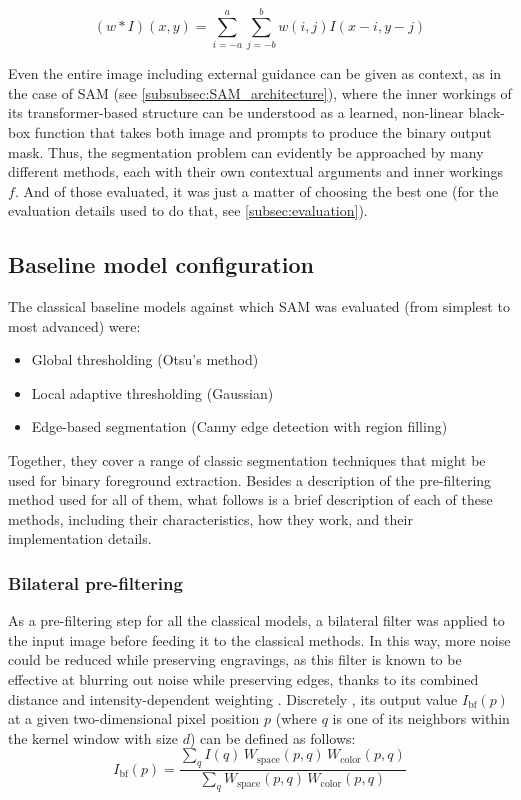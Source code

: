 $$ (w * I)(x,y) = \sum_{i=-a}^{a} \sum_{j=-b}^{b} w(i,j) I(x-i, y-j) $$

\noindent Even the entire image including external guidance can be given as context, as in the case of \acs{SAM} (see \cref{subsubsec:SAM_architecture}), where the inner workings of its transformer-based structure can be understood as a learned, non-linear black-box function that takes both image and prompts to produce the binary output mask.
Thus, the segmentation problem can evidently be approached by many different methods, each with their own contextual arguments and inner workings $f$.
And of those evaluated, it was just a matter of choosing the best one (for the evaluation details used to do that, see \cref{subsec:evaluation}).

\subsection{Baseline model configuration}
The classical baseline models against which \acs{SAM} was evaluated (from simplest to most advanced) were:
\begin{itemize}
    \item Global thresholding (Otsu's method)
    \item Local adaptive thresholding (Gaussian)
    \item Edge-based segmentation (Canny edge detection with region filling)
\end{itemize}
Together, they cover a range of classic segmentation techniques that might be used for binary foreground extraction.
Besides a description of the pre-filtering method used for all of them, what follows is a brief description of each of these methods, including their characteristics, how they work, and their implementation details.

\subsubsection{Bilateral pre-filtering} \label{subsubsec:bilateral_pre_filtering}
As a pre-filtering step for all the classical models, a bilateral filter \parencite[see][]{TomasiManduchi1998} was applied to the input image before feeding it to the classical methods.
In this way, more noise could be reduced while preserving engravings, as this filter is known to be effective at blurring out noise while preserving edges, thanks to its combined distance and intensity-dependent weighting \parencite{TomasiManduchi1998}.
Discretely \parencite[see][]{Pan2025InnovativeBilateral}, its output value $I_{\mathrm{bf}}(p)$ at a given two-dimensional pixel position $p$ (where $q$ is one of its neighbors within the kernel window with size $d$) can be defined as follows:
$$I_{\mathrm{bf}}(p)=
\frac{\sum_q I(q)\,W_{\mathrm{space}}(p,q)\,W_{\mathrm{color}}(p,q)}
{\sum_q W_{\mathrm{space}}(p,q)\,W_{\mathrm{color}}(p,q)}$$

